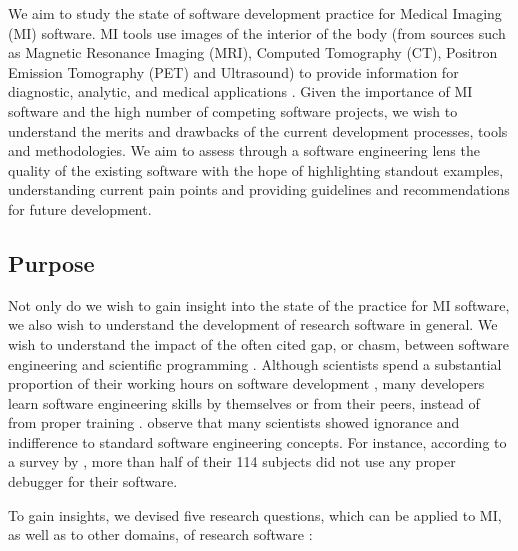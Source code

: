 \documentclass[3p, 12pt,authoryear]{elsarticle}
\begin{document}
We aim to study the state of software development practice for Medical Imaging
(MI) software.  MI tools use images of the interior of the body (from sources
such as Magnetic Resonance Imaging (MRI), Computed Tomography (CT), Positron
Emission Tomography (PET) and Ultrasound) to provide information for diagnostic,
analytic, and medical applications \citep{FDA2021, enwiki:1034887445,
Zhang2008}.  Given the importance of MI software and the high number of
competing software projects, we wish to understand the merits and drawbacks of
the current development processes, tools and methodologies.  We aim to assess
through a software engineering lens the quality of the existing software with
the hope of highlighting standout examples, understanding current pain points
and providing guidelines and recommendations for future development.

\subsection{Purpose} \label{sec_motivation}

Not only do we wish to gain insight into the state of the practice for MI
software, we also wish to understand the development of research software in
general. We wish to understand the impact of the often cited gap, or chasm,
between software engineering and scientific programming \citep{Storer2017}.
Although scientists spend a substantial proportion of their working hours on
software development \citep{Hannay2009, Prabhu2011}, many developers learn
software engineering skills by themselves or from their peers, instead of from
proper training \citep{Hannay2009}. \citet{Hannay2009} observe that many
scientists showed ignorance and indifference to standard software engineering
concepts. For instance, according to a survey by \citet{Prabhu2011}, more than
half of their 114 subjects did not use any proper debugger for their software.

To gain insights, we devised five research questions, which can be applied
to MI, as well as to other domains, of research software \citep{SmithEtAl2021}:
\end{document}
